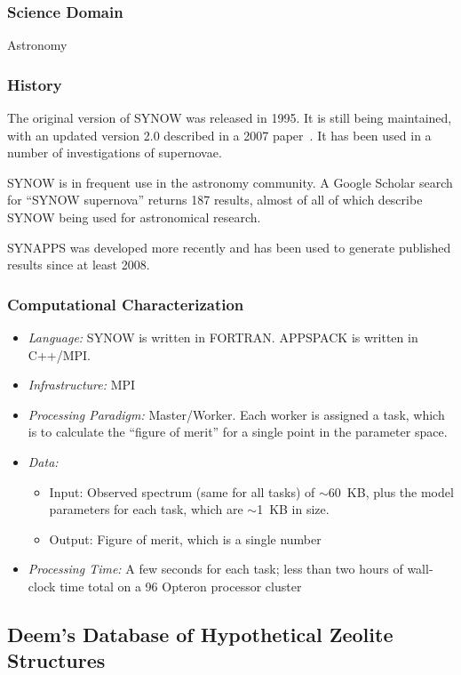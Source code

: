 \documentclass[10pt,letterpaper]{article}
\begin{document}
\subsubsection{Science Domain} Astronomy

\subsubsection{History}
The original version of SYNOW was released in 1995.
It is still being maintained, with an updated version 2.0 described in a
2007 paper~\cite{branch-synow-07}.  It has been used in a number of investigations
of supernovae.

SYNOW is in frequent use in the astronomy community.  A Google Scholar search for ``SYNOW supernova''
 returns 187 results, almost of all of which describe SYNOW being used for  astronomical research.

SYNAPPS was developed more recently and has been used to generate published
results since at least 2008.

\subsubsection{Computational Characterization}

\begin {itemize}
\item {\em Language:} SYNOW is written in FORTRAN. APPSPACK is written in C++/MPI.
\item {\em Infrastructure:} MPI
\item {\em Processing Paradigm:} Master/Worker.  Each worker is assigned a task, which is
            to calculate the ``figure of merit'' for a single point in the parameter space.
\item {\em Data:} \begin{itemize}
    \item Input: Observed spectrum (same for all tasks) of $\sim$60~KB, plus the model parameters for each task, which are $\sim$1~KB in size.
    \item Output: Figure of merit, which is a single number
    \end{itemize}
\item {\em Processing Time:} A few seconds for each task; less than two hours of wall-clock time
                total on a 96 Opteron processor cluster
\end {itemize}


\subsection{Deem's Database of Hypothetical Zeolite Structures}
\end{document}
